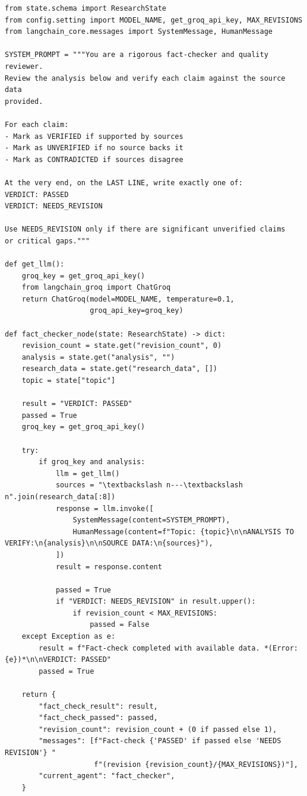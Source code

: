 \documentclass[11pt, a4paper]{article}
\begin{document}
\begin{lstlisting}[style=pythonstyle, caption={agents/fact\_checker.py --- Poora Code}]
from state.schema import ResearchState
from config.setting import MODEL_NAME, get_groq_api_key, MAX_REVISIONS
from langchain_core.messages import SystemMessage, HumanMessage

SYSTEM_PROMPT = """You are a rigorous fact-checker and quality reviewer.
Review the analysis below and verify each claim against the source data
provided.

For each claim:
- Mark as VERIFIED if supported by sources
- Mark as UNVERIFIED if no source backs it
- Mark as CONTRADICTED if sources disagree

At the very end, on the LAST LINE, write exactly one of:
VERDICT: PASSED
VERDICT: NEEDS_REVISION

Use NEEDS_REVISION only if there are significant unverified claims
or critical gaps."""

def get_llm():
    groq_key = get_groq_api_key()
    from langchain_groq import ChatGroq
    return ChatGroq(model=MODEL_NAME, temperature=0.1,
                    groq_api_key=groq_key)

def fact_checker_node(state: ResearchState) -> dict:
    revision_count = state.get("revision_count", 0)
    analysis = state.get("analysis", "")
    research_data = state.get("research_data", [])
    topic = state["topic"]

    result = "VERDICT: PASSED"
    passed = True
    groq_key = get_groq_api_key()

    try:
        if groq_key and analysis:
            llm = get_llm()
            sources = "\textbackslash n---\textbackslash n".join(research_data[:8])
            response = llm.invoke([
                SystemMessage(content=SYSTEM_PROMPT),
                HumanMessage(content=f"Topic: {topic}\n\nANALYSIS TO VERIFY:\n{analysis}\n\nSOURCE DATA:\n{sources}"),
            ])
            result = response.content

            passed = True
            if "VERDICT: NEEDS_REVISION" in result.upper():
                if revision_count < MAX_REVISIONS:
                    passed = False
    except Exception as e:
        result = f"Fact-check completed with available data. *(Error: {e})*\n\nVERDICT: PASSED"
        passed = True

    return {
        "fact_check_result": result,
        "fact_check_passed": passed,
        "revision_count": revision_count + (0 if passed else 1),
        "messages": [f"Fact-check {'PASSED' if passed else 'NEEDS REVISION'} "
                     f"(revision {revision_count}/{MAX_REVISIONS})"],
        "current_agent": "fact_checker",
    }
\end{lstlisting}
\end{document}
